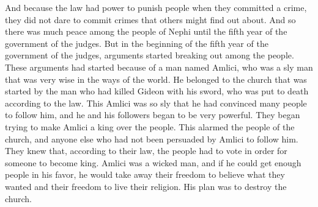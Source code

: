 And because the law had power to punish people when they committed a crime, they did not dare to commit crimes that others might find out about. And so there was much peace among the people of Nephi until the fifth year of the government of the judges.
\bchapter
\bverse \iffalse And it came to pass in the commencement of the fifth year of their reign there began to be a contention among the people; for a certain man, being called Amlici, he being a very cunning man, yea, a wise man as to the wisdom of the world, he being after the order of the man that slew Gideon by the sword, who was executed according to the law-- \fi
But in the beginning of the fifth year of the government of the judges, arguments started breaking out among the people. These arguments had started because of a man named Amlici, who was a sly man that was very wise in the ways of the world. He belonged to the church that was started by the man who had killed Gideon with his sword, who was put to death according to the law.
\bverse \iffalse Now this Amlici had, by his cunning, drawn away much people after him; even so much that they began to be very powerful; and they began to endeavor to establish Amlici to be king over the people. \fi
This Amlici was so sly that he had convinced many people to follow him, and he and his followers began to be very powerful. They began trying to make Amlici a king over the people.
\bverse \iffalse Now this was alarming to the people of the church, and also to all those who had not been drawn away after the persuasions of Amlici; for they knew that according to their law that such things must be established by the voice of the people. \fi
This alarmed the people of the church, and anyone else who had not been persuaded by Amlici to follow him. They knew that, according to their law, the people had to vote in order for someone to become king.
\bverse \iffalse Therefore, if it were possible that Amlici should gain the voice of the people, he, being a wicked man, would deprive them of their rights and privileges of the church; for it was his intent to destroy the church of God. \fi
Amlici was a wicked man, and if he could get enough people in his favor, he would take away their freedom to believe what they wanted and their freedom to live their religion. His plan was to destroy the church.
\bverse \iffalse And it came to pass that the people assembled themselves together throughout all the land, every man according to his mind, whether it were for or against Amlici, in separate bodies, having much dispute and wonderful contentions one with another. \fi
